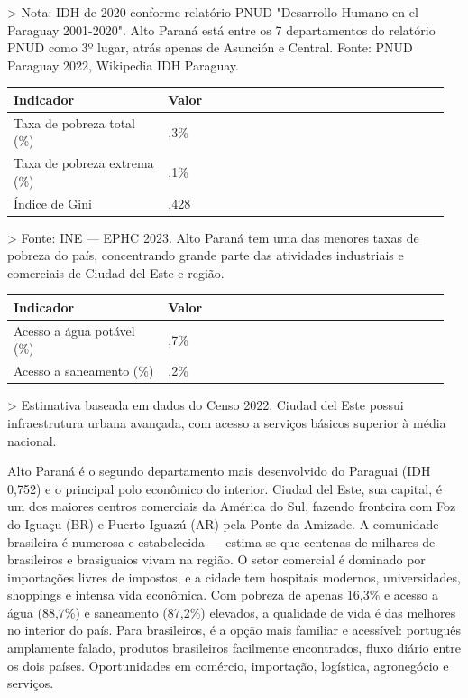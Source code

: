 > Nota: IDH de 2020 conforme relatório PNUD "Desarrollo Humano en el Paraguay 2001-2020". Alto Paraná está entre os 7 departamentos do relatório PNUD como 3º lugar, atrás apenas de Asunción e Central. Fonte: PNUD Paraguay 2022, Wikipedia IDH Paraguay.


{\small
\setlength{\tabcolsep}{3pt}
\renewcommand{\arraystretch}{1.12}
\begin{tabularx}{\linewidth}{>{\raggedright\arraybackslash}p{0.34\linewidth} >{\raggedright\arraybackslash}p{0.62\linewidth}}
\toprule
Indicador & Valor \\
\midrule
Taxa de pobreza total (\%) & 16,3\% \\
Taxa de pobreza extrema (\%) & 3,1\% \\
Índice de Gini & 0,428 \\
\bottomrule
\end{tabularx}
}

> Fonte: INE --- EPHC 2023. Alto Paraná tem uma das menores taxas de pobreza do país, concentrando grande parte das atividades industriais e comerciais de Ciudad del Este e região.


{\small
\setlength{\tabcolsep}{3pt}
\renewcommand{\arraystretch}{1.12}
\begin{tabularx}{\linewidth}{>{\raggedright\arraybackslash}p{0.34\linewidth} >{\raggedright\arraybackslash}p{0.62\linewidth}}
\toprule
Indicador & Valor \\
\midrule
Acesso a água potável (\%) & 88,7\% \\
Acesso a saneamento (\%) & 87,2\% \\
\bottomrule
\end{tabularx}
}

> Estimativa baseada em dados do Censo 2022. Ciudad del Este possui infraestrutura urbana avançada, com acesso a serviços básicos superior à média nacional.


Alto Paraná é o segundo departamento mais desenvolvido do Paraguai (IDH 0,752) e o principal polo econômico do interior. Ciudad del Este, sua capital, é um dos maiores centros comerciais da América do Sul, fazendo fronteira com Foz do Iguaçu (BR) e Puerto Iguazú (AR) pela Ponte da Amizade. A comunidade brasileira é numerosa e estabelecida --- estima-se que centenas de milhares de brasileiros e brasiguaios vivam na região. O setor comercial é dominado por importações livres de impostos, e a cidade tem hospitais modernos, universidades, shoppings e intensa vida econômica. Com pobreza de apenas 16,3\% e acesso a água (88,7\%) e saneamento (87,2\%) elevados, a qualidade de vida é das melhores no interior do país. Para brasileiros, é a opção mais familiar e acessível: português amplamente falado, produtos brasileiros facilmente encontrados, fluxo diário entre os dois países. Oportunidades em comércio, importação, logística, agronegócio e serviços.


